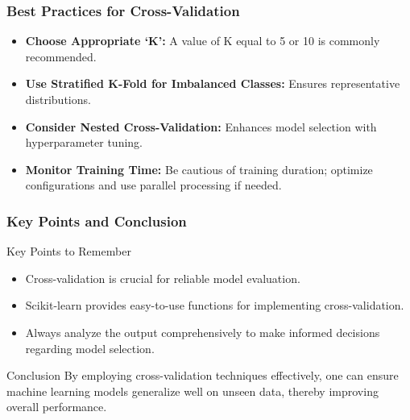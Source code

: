 \documentclass{beamer}
\begin{document}
\begin{frame}[fragile]
    \frametitle{Best Practices for Cross-Validation}
    \begin{itemize}
        \item \textbf{Choose Appropriate ‘K’:} A value of K equal to 5 or 10 is commonly recommended.
        \item \textbf{Use Stratified K-Fold for Imbalanced Classes:} Ensures representative distributions.
        \item \textbf{Consider Nested Cross-Validation:} Enhances model selection with hyperparameter tuning.
        \item \textbf{Monitor Training Time:} Be cautious of training duration; optimize configurations and use parallel processing if needed.
    \end{itemize}
\end{frame}

\begin{frame}[fragile]
    \frametitle{Key Points and Conclusion}
    \begin{block}{Key Points to Remember}
        \begin{itemize}
            \item Cross-validation is crucial for reliable model evaluation.
            \item Scikit-learn provides easy-to-use functions for implementing cross-validation.
            \item Always analyze the output comprehensively to make informed decisions regarding model selection.
        \end{itemize}
    \end{block}

    \begin{block}{Conclusion}
        By employing cross-validation techniques effectively, one can ensure machine learning models generalize well on unseen data, thereby improving overall performance.
    \end{block}
\end{frame}
\end{document}
